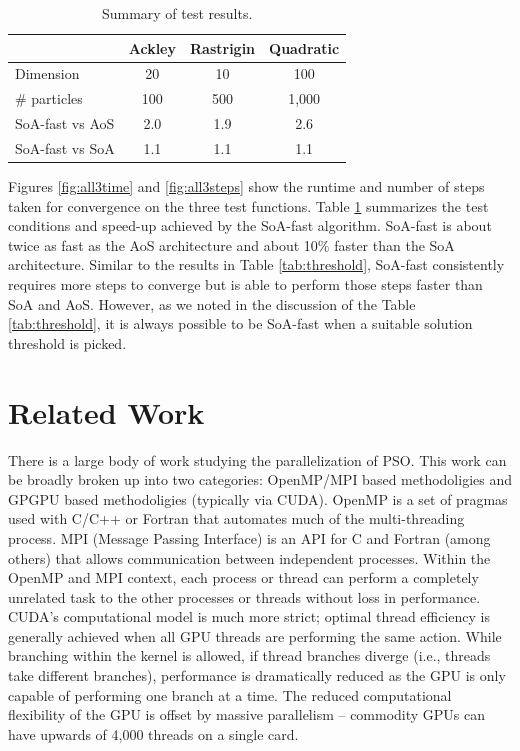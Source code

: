 \begin{table}
  \centering
  \caption{Summary of test results.}
  \label{tab:results}
  \begin{tabular}{lccc}\toprule
    & \textbf{Ackley} & \textbf{Rastrigin} & \textbf{Quadratic}\\\midrule
    Dimension & 20 & 10 & 100\\
    \# particles & 100 & 500 & 1,000\\
    SoA-fast vs AoS & 2.0 & 1.9 & 2.6\\
    SoA-fast vs SoA & 1.1 & 1.1 & 1.1\\\bottomrule
  \end{tabular}
\end{table}

Figures \ref{fig:all3time} and \ref{fig:all3steps} show the runtime and number
of steps taken for convergence on the three test functions. Table
\ref{tab:results} summarizes the test conditions and speed-up achieved by the
SoA-fast algorithm. SoA-fast is about twice as fast as the AoS architecture and
about 10\% faster than the SoA architecture. Similar to the results in Table
\ref{tab:threshold}, SoA-fast consistently requires more steps to converge but
is able to perform those steps faster than SoA and AoS. However, as we noted in
the discussion of the Table \ref{tab:threshold}, it is always possible to be
SoA-fast when a suitable solution threshold is picked.

\section{Related Work}\label{sec:prior}
There is a large body of work studying the parallelization of PSO. This work can
be broadly broken up into two categories: OpenMP/MPI based methodoligies and
GPGPU based methodoligies (typically via CUDA). OpenMP is a set of pragmas used
with C/C++ or Fortran that automates much of the multi-threading process. MPI
(Message Passing Interface) is an API for C and Fortran (among others) that
allows communication between independent processes. Within the OpenMP and MPI
context, each process or thread can perform a completely unrelated task to the
other processes or threads without loss in performance. CUDA's computational
model is much more strict; optimal thread efficiency is generally achieved when
all GPU threads are performing the same action. While branching within the
kernel is allowed, if thread branches diverge (i.e., threads take different
branches), performance is dramatically reduced as the GPU is only capable of
performing one branch at a time. The reduced computational flexibility of the
GPU is offset by massive parallelism -- commodity GPUs can have upwards of 4,000
threads on a single card.

